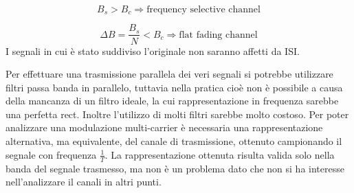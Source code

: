 
\[
  B_s > B_c \Rightarrow \text{frequency selective channel}  
\]

\[
    \Delta B = \frac{B_s}{N} < B_c \Rightarrow \text{flat fading channel}
\]
I segnali in cui è stato suddiviso l'originale non saranno affetti da ISI.

Per effettuare una trasmissione parallela dei veri segnali si potrebbe utilizzare filtri passa banda in parallelo, tuttavia nella pratica cioè non è possibile a causa della mancanza di un filtro ideale, la cui rappresentazione in frequenza sarebbe una perfetta rect. Inoltre l'utilizzo di molti filtri sarebbe molto costoso.
Per poter analizzare una modulazione multi-carrier è necessaria una rappresentazione alternativa, ma equivalente, del canale di trasmissione, ottenuto campionando il segnale con frequenza $\frac{1}{T}$. La rappresentazione ottenuta risulta valida solo nella banda del segnale trasmesso, ma non è un problema dato che non si ha interesse nell'analizzare il canali in altri punti.

